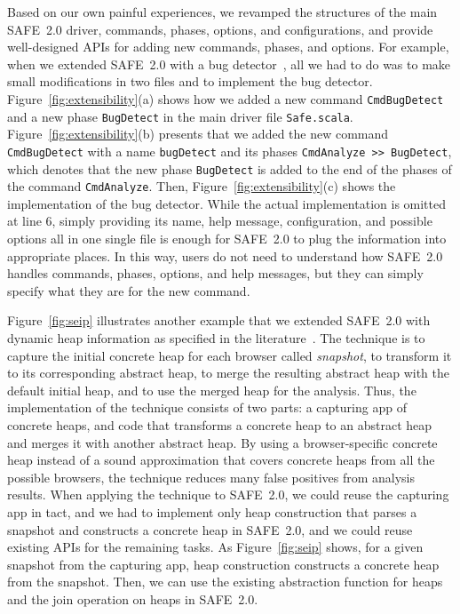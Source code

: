 \documentclass[10pt, conference]{IEEEtran}
\newcommand{\mtt}[1]{\texttt{\small #1}}
\newcommand{\msf}[1]{{\sf\small #1}}
\newcommand{\safe}{{SAFE~2.0}\xspace}
\begin{document}
Based on our own painful experiences, we revamped the structures of
the main \safe driver, commands, phases, options, and configurations,
and provide well-designed APIs for adding new commands, phases, and
options.  For example, when we extended \safe with a bug
detector~\cite{safewapp}, all we had to do was to make small
modifications in two files and to implement the bug detector.
Figure~\ref{fig:extensibility}(a) shows how we added a new command
\mtt{CmdBugDetect} and a new phase \mtt{BugDetect} in the main
driver file \mtt{Safe.scala}.  Figure~\ref{fig:extensibility}(b) presents
that we added the new command \mtt{CmdBugDetect} with a name
\mtt{bugDetect} and its phases \mtt{CmdAnalyze >> BugDetect},
which denotes that the new phase \mtt{BugDetect} is added to the end
of the phases of the command \mtt{CmdAnalyze}.  Then,
Figure~\ref{fig:extensibility}(c) shows the implementation of the
bug detector.  While the actual implementation is omitted at line 6,
simply providing its name, help message, configuration, and possible
options all in one single file is enough for \safe to plug the
information into appropriate places.  In this way, users do not
need to understand how \safe handles commands, phases, options, and
help messages, but they can simply specify what they are for the new
command.

Figure~\ref{fig:seip} illustrates another example that we extended \safe
with dynamic heap information as specified in the
literature~\cite{safehybrid}.  The technique is to capture the initial
concrete heap for each browser called \emph{snapshot}, to transform
it to its corresponding abstract heap, to merge the resulting
abstract heap with the default initial heap, and to use the merged heap
for the analysis.  Thus, the implementation of the technique consists
of two parts: a capturing app of concrete heaps, and code that
transforms a concrete heap to an abstract heap and merges it with another
abstract heap.  By using a browser-specific concrete heap
instead of a sound approximation that covers concrete heaps from
all the possible browsers, the technique reduces many false positives
from analysis results.  When applying the technique to \safe, we could
reuse the capturing app in tact, and we had to implement only 
\msf{heap construction} that parses a snapshot and constructs a concrete
heap in \safe, and we could reuse existing APIs for the remaining tasks.
As Figure~\ref{fig:seip} shows, for a given snapshot from the capturing
app, \msf{heap construction} constructs a concrete heap from the
snapshot.  Then, we can use the existing abstraction function for heaps
and the join operation on heaps in \safe.
\end{document}
